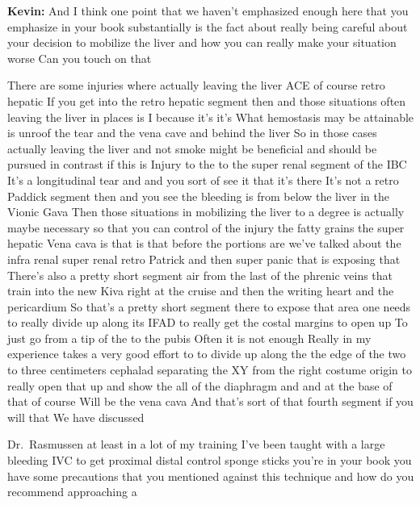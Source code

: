 \documentclass[
]{book}
\begin{document}
\textbf{Kevin:} And I think one point that we haven't emphasized enough here that you emphasize in your book substantially is the fact about really being careful about your decision to mobilize the liver and how you can really make your situation worse Can you touch on that

There are some injuries where actually leaving the liver ACE of course retro hepatic If you get into the retro hepatic segment then and those situations often leaving the liver in places is I because it's it's What hemostasis may be attainable is unroof the tear and the vena cave and behind the liver So in those cases actually leaving the liver and not smoke might be beneficial and should be pursued in contrast if this is Injury to the to the super renal segment of the IBC It's a longitudinal tear and and you sort of see it that it's there It's not a retro Paddick segment then and you see the bleeding is from below the liver in the Vionic Gava Then those situations in mobilizing the liver to a degree is actually maybe necessary so that you can control of the injury the fatty grains the super hepatic Vena cava is that is that before the portions are we've talked about the infra renal super renal retro Patrick and then super panic that is exposing that There's also a pretty short segment air from the last of the phrenic veins that train into the new Kiva right at the cruise and then the writing heart and the pericardium So that's a pretty short segment there to expose that area one needs to really divide up along its IFAD to really get the costal margins to open up To just go from a tip of the to the pubis Often it is not enough Really in my experience takes a very good effort to to divide up along the the edge of the two to three centimeters cephalad separating the XY from the right costume origin to really open that up and show the all of the diaphragm and and at the base of that of course Will be the vena cava And that's sort of that fourth segment if you will that We have discussed

Dr.~Rasmussen at least in a lot of my training I've been taught with a large bleeding IVC to get proximal distal control sponge sticks you're in your book you have some precautions that you mentioned against this technique and how do you recommend approaching a
\end{document}
